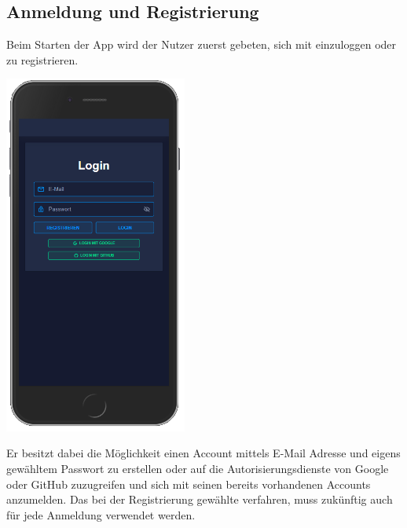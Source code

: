 \documentclass[a4paper]{article}
\theoremstyle{definition}
\begin{document}
\subsection*{Anmeldung und Registrierung}
Beim Starten der App wird der Nutzer zuerst gebeten, sich mit einzuloggen oder zu registrieren.
\begin{center}
	\includegraphics[width= 6cm, keepaspectratio]{img/login}
\end{center}
Er besitzt dabei die Möglichkeit einen Account mittels E-Mail Adresse und eigens gewähltem Passwort zu erstellen oder auf die Autorisierungsdienste von Google oder GitHub zuzugreifen und sich mit seinen bereits vorhandenen Accounts anzumelden. Das bei der Registrierung gewählte verfahren, muss zukünftig auch für jede Anmeldung verwendet werden.
\end{document}
